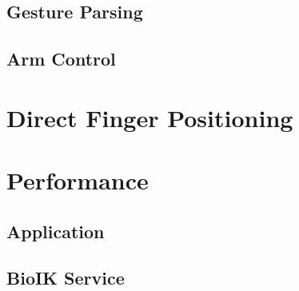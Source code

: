 \subsection{Gesture Parsing}

\subsection{Arm Control}

\section{Direct Finger Positioning}

\section{Performance}

\subsection{Application}

\subsection{BioIK Service}